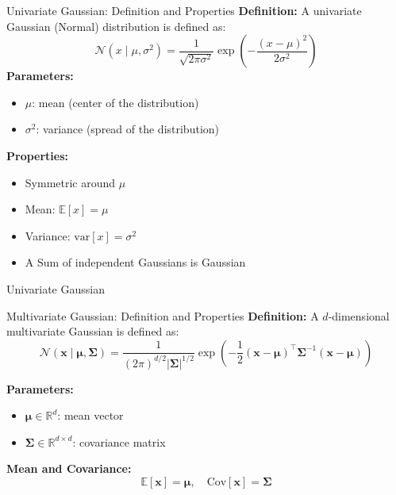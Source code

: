 \documentclass{beamer}
\begin{document}
\begin{frame}{Univariate Gaussian: Definition and Properties}
\textbf{Definition:} A univariate Gaussian (Normal) distribution is defined as:
\[
\mathcal{N}(x \mid \mu, \sigma^2) = \frac{1}{\sqrt{2\pi\sigma^2}} \exp\left( -\frac{(x - \mu)^2}{2\sigma^2} \right)
\]
\textbf{Parameters:}
\begin{itemize}
  \item $\mu$: mean (center of the distribution)
  \item $\sigma^2$: variance (spread of the distribution)
\end{itemize}

\vspace{0.5em}
\textbf{Properties:}
\begin{itemize}
  \item Symmetric around $\mu$
  \item Mean: $\mathbb{E}[x] = \mu$
  \item Variance: $\text{var}[x] = \sigma^2$
  \item A Sum of independent Gaussians is Gaussian
\end{itemize}
\end{frame}

\begin{frame}{Univariate Gaussian}

\begin{center}
\end{center}

\end{frame}



\begin{frame}{Multivariate Gaussian: Definition and Properties}
\textbf{Definition:} A $d$-dimensional multivariate Gaussian is defined as:
\[
\mathcal{N}(\mathbf{x} \mid \boldsymbol{\mu}, \boldsymbol{\Sigma}) =
\frac{1}{(2\pi)^{d/2} |\boldsymbol{\Sigma}|^{1/2}}
\exp\left( -\frac{1}{2} (\mathbf{x} - \boldsymbol{\mu})^\top \boldsymbol{\Sigma}^{-1} (\mathbf{x} - \boldsymbol{\mu}) \right)
\]

\textbf{Parameters:}
\begin{itemize}
  \item $\boldsymbol{\mu} \in \mathbb{R}^d$: mean vector
  \item $\boldsymbol{\Sigma} \in \mathbb{R}^{d \times d}$: covariance matrix
\end{itemize}

\textbf{Mean and Covariance:}
\[
\mathbb{E}[\mathbf{x}] = \boldsymbol{\mu}, \quad \text{Cov}[\mathbf{x}] = \boldsymbol{\Sigma}
\]
\end{frame}
\end{document}

